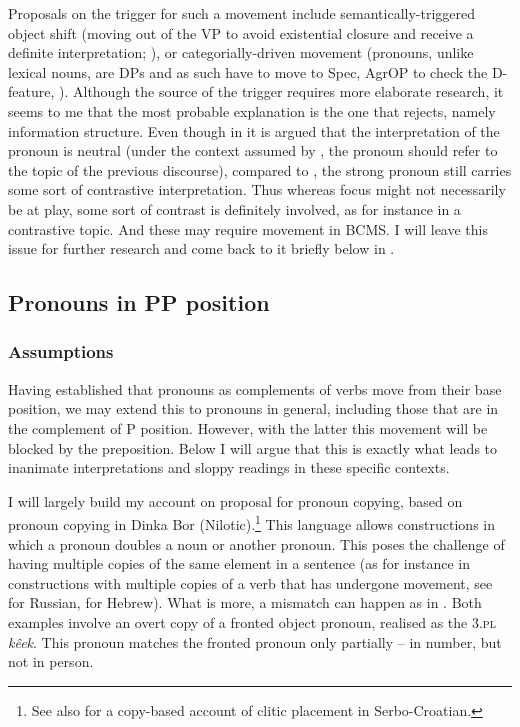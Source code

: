 \documentclass[output=paper,colorlinks,citecolor=brown]{langscibook}
\begin{document}
\noindent Proposals on the trigger for such a movement include semantically-triggered object shift (moving out of the VP to avoid existential closure and receive a definite interpretation; \citealt{stojanovic97}), or categorially-driven movement (pronouns, unlike lexical nouns, are DPs and as such have to move to Spec, AgrOP to check the D-feature, \citealt{beslinNPDP}). 
Although the source of the trigger requires more elaborate research, it seems to me that the most probable explanation is the one that  \citet{beslinNPDP} rejects, namely information structure. Even though in  it is argued that the interpretation of the pronoun is neutral (under the context assumed by \citeauthor{beslinNPDP}, the pronoun should refer to the topic of the previous discourse), compared to , the strong pronoun still carries some sort of contrastive interpretation. Thus whereas focus might not necessarily be at play, some sort of contrast is definitely involved, as for instance in a contrastive topic. And these may require movement in BCMS. I will leave this issue for further research and come back to it briefly below in .

\subsection{Pronouns in PP position}\label{subsec:pronounsinPP}

\subsubsection{Assumptions}

Having established that pronouns as complements of verbs move from their base position, we may extend this to pronouns in general, including those that are in the complement of P position. However, with the latter this movement will be blocked by the preposition. Below I will argue that this is exactly what leads to inanimate interpretations and sloppy readings in these specific contexts. 
   
I will largely build my account on  proposal for pronoun copying, based on pronoun copying in Dinka Bor (Nilotic).\footnote{See also \citet{boskovic01book} for a copy-based account of clitic placement in Serbo-Croatian.}
This language allows constructions in which a pronoun doubles a noun or another pronoun. This poses the challenge of having multiple copies of the same element in a sentence (as for instance in constructions with multiple copies of a verb that has undergone movement, see \citealt{abels01} for Russian, \citealt{landau06} for Hebrew). What is more, a mismatch can happen as in . Both examples involve an overt copy of a fronted object pronoun, realised as the \textsc{3.pl} \textit{k\^eek}. This pronoun matches the fronted pronoun only partially -- in number, but not in person. 
\end{document}
